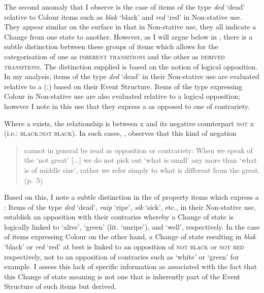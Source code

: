 The second anomaly that I observe is the case of items of the type \textit{ded} `dead' relative to Colour items such as \textit{blak} `black' and \textit{red} `red' in Non-stative use. They appear similar on the surface in that in Non-stative use, they all indicate a Change from one state to another. However, as I will argue below in , there is a subtle distinction between these groups of items which allows for the categorisation of one as \textsc{inherent transitions} and the other as \textsc{derived transitions}. The distinction supplied is based on the notion of logical opposition. In my analysis, items of the type \textit{ded} `dead' in their Non-stative use are evaluated relative to a  (\DEAD:\ALIVE) based on their Event Structure. Items of the type expressing Colour in Non-stative use are also evaluated relative to a logical opposition; however I note in this use that they express a  as opposed to one of contrariety.\largerpage[-1] 

Where a  exists, the relationship is between x and its negative counterpart \textsc{not} x (i.e.: \textsc{black:not black}). In such cases, \citet{Horn1989}, observes that this kind of negation

\begin{quote}
cannot in general be read as opposition or contrariety: When we speak of the `not great' [...] we do not pick out `what is small' any more than `what is of middle size', rather we refer simply to what is different from the great. (p.~5)
\end{quote}

Based on this, I note a subtle distinction in the  of property items which express a : Items of the type \textit{ded} `dead', \textit{raip} `ripe', \textit{sik} `sick', etc., in their Non-stative use, establish an opposition with their contraries whereby a Change of state is logically linked to `alive', `green' (lit. `unripe'), and `well', respectively. In the case of items expressing Colour on the other hand, a Change of state resulting in \textit{blak} `black' or \textit{red} `red' at best is linked to an opposition of \textsc{not black} or \textsc{not red} respectively, not to an opposition of contraries such as `white' or `green' for example. I assess this lack of specific information as associated with the fact that this Change of state meaning is not one that is inherently part of the Event Structure of such items but derived. 

